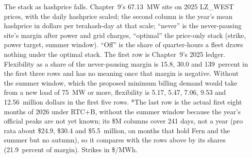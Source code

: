 \begin{table}[htbp]
  \caption{The stack as hashprice falls. Chapter~9's 67.13~MW site on 2025 LZ\_WEST prices, with the daily hashprice scaled; the second column is the year's mean hashprice in dollars per terahash-day at that scale; ``never'' is the never-pausing site's margin after power and grid charges, ``optimal'' the price-only stack (strike, power target, summer window). ``Off'' is the share of quarter-hours a fleet draws nothing under the optimal stack. The first row is Chapter~9's 2025 ledger. Flexibility as a share of the never-pausing margin is 15.8, 30.0 and 139~percent in the first three rows and has no meaning once that margin is negative. Without the summer window, which the proposed minimum billing demand would take from a new load of 75~MW or more, flexibility is 5.17, 5.47, 7.06, 9.53 and 12.56~million dollars in the first five rows. *The last row is the actual first eight months of 2026 under RTC+B, without the summer window because the year's official peaks are not yet known; its \$M columns cover 241 days, not a year (pro rata about \$24.9, \$30.4 and \$5.5~million, on months that hold Fern and the summer but no autumn), so it compares with the rows above by its shares (21.9~percent of margin). Strikes in \$/MWh.} %
  \label{tab:outlook-sensitivity}
\end{table}

